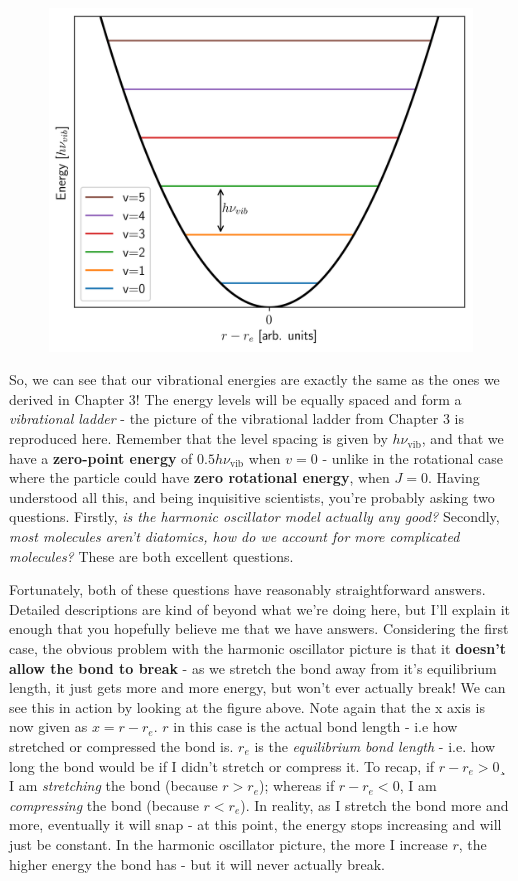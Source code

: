 \documentclass{memoir}[11pt,oneside,a4paper,openany]
\newcommand{\nuv}{\ensuremath{\nu_{\text{vib}}}}
\begin{document}
\begin{figure}
	\centering
	\includegraphics[width=\linewidth]{harmonic_oscillator_energies}
\end{figure}
So, we can see that our vibrational energies are exactly the same as the ones we derived in Chapter 3! The energy levels will be equally spaced and form a \emph{vibrational ladder} - the picture of the vibrational ladder from Chapter 3 is reproduced here. Remember that the level spacing is given by $h\nuv$, and that we have a \textbf{zero-point energy} of $0.5h\nuv$ when $v=0$ - unlike in the rotational case where the particle could have \textbf{zero rotational energy}, when $J=0$. Having understood all this, and being inquisitive scientists, you're probably asking two questions. Firstly, \emph{is the harmonic oscillator model actually any good?} Secondly, \emph{most molecules aren't diatomics, how do we account for more complicated molecules?} These are both excellent questions.    

Fortunately, both of these questions have reasonably straightforward answers. Detailed descriptions are kind of beyond what we're doing here, but I'll explain it enough that you hopefully believe me that we have answers. Considering the first case, the obvious problem with the harmonic oscillator picture is that it \textbf{doesn't allow the bond to break} - as we stretch the bond away from it's equilibrium length, it just gets more and more energy, but won't ever actually break! We can see this in action by looking at the figure above. Note again that the x axis is now given as $x = r-r_e$. $r$ in this case is the actual bond length - i.e how stretched or compressed the bond is. $r_e$ is the \emph{equilibrium bond length} - i.e. how long the bond would be if I didn't stretch or compress it. To recap, if $r-r_e > 0$¸ I am \emph{stretching} the bond (because $r>r_e$); whereas if $r-r_e < 0$, I am \emph{compressing} the bond (because $r<r_e$). In reality, as I stretch the bond more and more, eventually it will snap - at this point, the energy stops increasing and will just be constant. In the harmonic oscillator picture, the more I increase $r$, the higher energy the bond has - but it will never actually break. 
\end{document}
